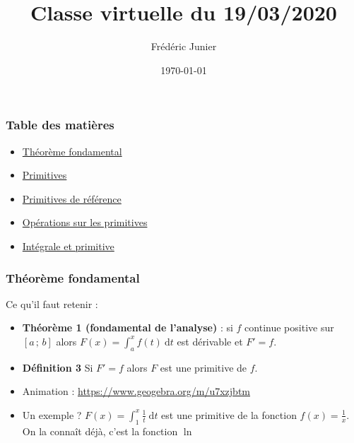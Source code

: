 \documentclass[11pt, hyperref={urlcolor=red,%
            linkcolor=blue, %
            colorlinks=true}]{beamer}
\title[exponentielle]{Classe virtuelle du 19/03/2020}
\author[F.Junier]{Fr\'ed\'eric Junier}
\institute[Le Parc]{{\centering Lyc\'ee du Parc \\
1 Boulevard Anatole France \\ 69006 Lyon }}
\date[\today]{\today}
\newcommand{\Interff}[2]{\left[#1\, ;\, #2\right]}
\newcommand{\dt}{\ensuremath{\text{d}t}}		%
\newcommand{\integralet}[3]{\int_{#1}^{#2} #3 \ \dt}
\begin{document}
\frame{\titlepage}




\begin{frame}
\frametitle{Table des matières}
\begin{itemize}
	\item \hyperlink{fondamental}{Théorème fondamental}
	\item \hyperlink{primitives}{Primitives}
	\item \hyperlink{primref}{Primitives de référence}
	\item \hyperlink{primop}{Opérations sur les primitives}
	\item \hyperlink{integrale}{Intégrale et primitive}
\end{itemize}

\end{frame}

\begin{frame}
\frametitle{Théorème fondamental}
\label{fondamental}

Ce qu'il faut retenir :

\begin{itemize}

	\item \textbf{Théorème 1 (fondamental de l'analyse)} : si $f$ continue positive sur $\Interff{a}{b}$ alors $F(x)=\integralet{a}{x}{f(t)}$ est dérivable et $F'=f$.  
	\pause \item \textbf{Définition 3}  Si $F'=f$ alors $F$ est une primitive de $f$.
	\pause \item Animation : \href{https://www.geogebra.org/m/u7xzjbtm}{https://www.geogebra.org/m/u7xzjbtm}
	\pause \item Un exemple ?  $F(x)=\integralet{1}{x}{\frac{1}{t}}$ est une primitive de la fonction $f(x)=\frac{1}{x}$. On la connaît déjà, c'est la fonction $\ln$
	


\end{itemize}

\end{frame}
\end{document}
